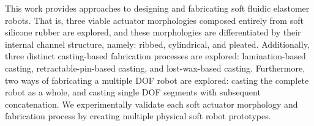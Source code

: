 This work provides approaches to designing and fabricating soft fluidic elastomer robots.
%
%
That is, three viable actuator morphologies composed entirely from soft silicone rubber are explored, and these morphologies are differentiated by their internal channel structure, namely: ribbed, cylindrical, and pleated.
%
Additionally, three distinct casting-based fabrication processes are explored: lamination-based casting, retractable-pin-based casting, and lost-wax-based casting.
%
Furthermore, two ways of fabricating a multiple DOF robot are explored: casting the complete robot as a whole, and casting single DOF segments with subsequent concatenation.
%
We experimentally validate each soft actuator morphology and fabrication process by creating multiple physical soft robot prototypes.

